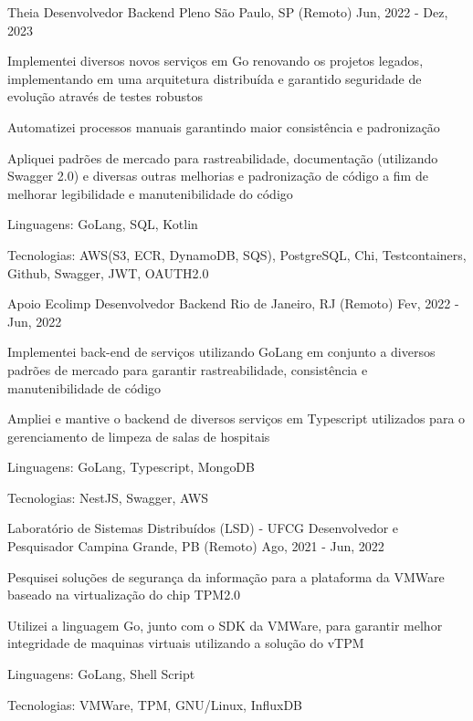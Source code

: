 
\begin{cventries}
  \cventry
  {Theia} %
  {Desenvolvedor Backend Pleno} %
  {São Paulo, SP (Remoto)} %
  {Jun, 2022 - Dez, 2023} %
  {
    \begin{cvitems} %
      \item {Implementei diversos novos serviços em Go renovando os projetos legados, implementando em uma arquitetura distribuída e garantido seguridade de evolução através de testes robustos}
      \item {Automatizei processos manuais garantindo maior consistência e padronização}
      \item {Apliquei padrões de mercado para rastreabilidade, documentação (utilizando Swagger 2.0) e diversas outras melhorias e padronização de código a fim de melhorar legibilidade e manutenibilidade do código}
      \item {Linguagens: GoLang, SQL, Kotlin}
      \item {Tecnologias: AWS(S3, ECR, DynamoDB, SQS), PostgreSQL, Chi, Testcontainers, Github, Swagger, JWT, OAUTH2.0}
    \end{cvitems}
  }

  \cventry
  {Apoio Ecolimp} %
  {Desenvolvedor Backend} %
  {Rio de Janeiro, RJ (Remoto)} %
  {Fev, 2022 - Jun, 2022} %
  {
    \begin{cvitems} %
      \item {Implementei back-end de serviços utilizando GoLang em conjunto a diversos padrões de mercado para garantir rastreabilidade, consistência e manutenibilidade de código}
      \item {Ampliei e mantive o backend de diversos serviços em Typescript utilizados para o gerenciamento de limpeza de salas de hospitais}
      \item {Linguagens: GoLang, Typescript, MongoDB}
      \item {Tecnologias: NestJS, Swagger, AWS}
    \end{cvitems}
  }

  \cventry
  {Laboratório de Sistemas Distribuídos (LSD) - UFCG} %
  {Desenvolvedor e Pesquisador} %
  {Campina Grande, PB (Remoto)} %
  {Ago, 2021 - Jun, 2022} %
  {
    \begin{cvitems} %
      \item {Pesquisei soluções de segurança da informação para a plataforma da VMWare baseado na virtualização do chip TPM2.0}
      \item {Utilizei a linguagem Go, junto com o SDK da VMWare, para garantir melhor integridade de maquinas virtuais utilizando a solução do vTPM}
      \item {Linguagens: GoLang, Shell Script}
      \item {Tecnologias: VMWare, TPM, GNU/Linux, InfluxDB}
    \end{cvitems}
  }


\end{cventries}
